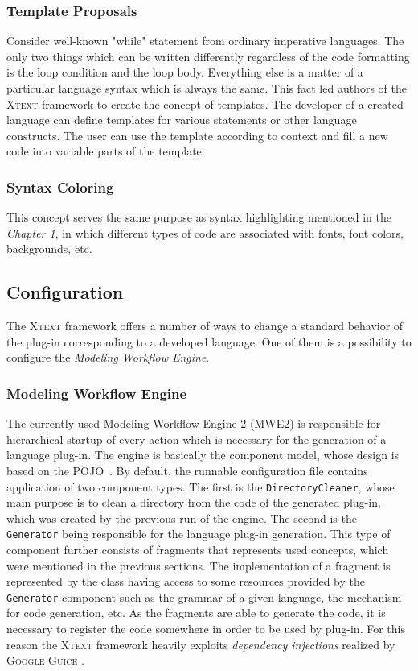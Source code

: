 \documentclass[12pt,notitlepage,a4paper]{report}
\begin{document}
\subsubsection{Template Proposals}{Consider well-known "while" statement from ordinary imperative languages. The only two things which can be written differently regardless of the code formatting is the loop condition and the loop body. Everything else is a matter of a particular language syntax which is always the same. This fact led authors of the \textsc{Xtext} framework to create the concept of templates. The developer of a created language can define templates for various statements or other language constructs. The user can use the template according to context and fill a new code into variable parts of the template. }

\subsubsection{Syntax Coloring}{This concept serves the same purpose as syntax highlighting mentioned in the \textit{Chapter 1}, in which different types of code are associated with  fonts, font colors, backgrounds, etc. }

\subsection{Configuration}
The \textsc{Xtext} framework offers a number of ways to change a standard behavior of the plug-in corresponding to a developed language.  One of them is a possibility to configure the \textit{Modeling Workflow Engine}.

\subsubsection{Modeling Workflow Engine}
\label{MWE}
The currently used Modeling Workflow Engine 2 (MWE2) is responsible for hierarchical startup of every action which is necessary for the generation of a language plug-in. The engine is basically the component model, whose design is based on the POJO~\cite{POJO}. By default, the runnable configuration file contains application of two component types. The first is the \texttt{DirectoryCleaner}, whose main purpose is to clean a directory from the code of the generated plug-in, which was created by the previous run of the engine. The second is the \texttt{Generator} being responsible for the language plug-in generation. This type of component further consists of fragments that represents used concepts, which were mentioned in the previous sections. The implementation of a fragment is represented by the class having access to some resources provided by the \texttt{Generator} component such as the grammar of a given language, the mechanism for code generation, etc. As the fragments are able to generate the code, it is necessary to register the code somewhere in order to be used by plug-in. For this reason the \textsc{Xtext} framework heavily exploits \textit{dependency injections} realized by \textsc{Google Guice} \cite{Guice}. 
\end{document}
